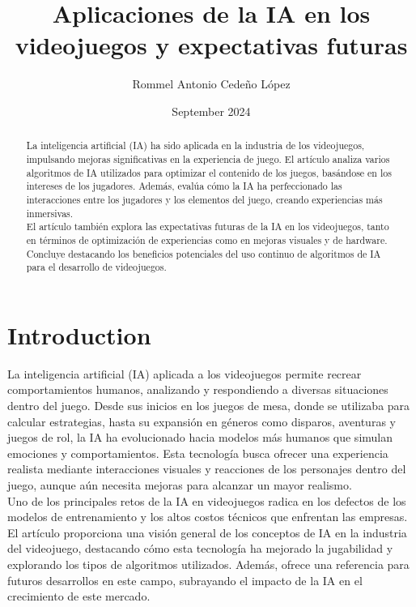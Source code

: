 \documentclass{article}
\title{Aplicaciones de la IA en los videojuegos y expectativas futuras}
\author{Rommel Antonio Cedeño López}
\date{September 2024}
\begin{document}
\maketitle

\begin{abstract}
    La inteligencia artificial (IA) ha sido aplicada en la industria de los videojuegos, impulsando mejoras significativas en la experiencia de juego. El artículo analiza varios algoritmos de IA utilizados para optimizar el contenido de los juegos, basándose en los intereses de los jugadores. Además, evalúa cómo la IA ha perfeccionado las interacciones entre los jugadores y los elementos del juego, creando experiencias más inmersivas.
\\

El artículo también explora las expectativas futuras de la IA en los videojuegos, tanto en términos de optimización de experiencias como en mejoras visuales y de hardware. Concluye destacando los beneficios potenciales del uso continuo de algoritmos de IA para el desarrollo de videojuegos.
\end{abstract}


\section{Introduction}
La inteligencia artificial (IA) aplicada a los videojuegos permite recrear comportamientos humanos, analizando y respondiendo a diversas situaciones dentro del juego. Desde sus inicios en los juegos de mesa, donde se utilizaba para calcular estrategias, hasta su expansión en géneros como disparos, aventuras y juegos de rol, la IA ha evolucionado hacia modelos más humanos que simulan emociones y comportamientos. Esta tecnología busca ofrecer una experiencia realista mediante interacciones visuales y reacciones de los personajes dentro del juego, aunque aún necesita mejoras para alcanzar un mayor realismo.
\\

Uno de los principales retos de la IA en videojuegos radica en los defectos de los modelos de entrenamiento y los altos costos técnicos que enfrentan las empresas. El artículo proporciona una visión general de los conceptos de IA en la industria del videojuego, destacando cómo esta tecnología ha mejorado la jugabilidad y explorando los tipos de algoritmos utilizados. Además, ofrece una referencia para futuros desarrollos en este campo, subrayando el impacto de la IA en el crecimiento de este mercado.
\end{document}
